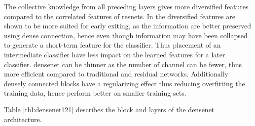 The collective knowledge from all preceding layers gives more diversified features compared to the correlated features of \gls{resnet}s. In \cite{huang_multi-scale_2017} the diversified features are shown to be more suited for early exiting,  as the information are better preserved using dense connection, hence even though information may have been collapsed to generate a short-term feature for the classifier. Thus placement of an intermediate classifier have less impact on the learned features for a later classifier. \gls{densenet} can be thinner as the number of channel can be fewer, thus more efficient compared to traditional and residual networks. Additionally densely connected blocks have a regularizing effect thus reducing overfitting the training data, hence perform better on smaller training sets. 

Table \ref{tbl:densenet121} describes the block and layers of the \gls{densenet} architecture. 

